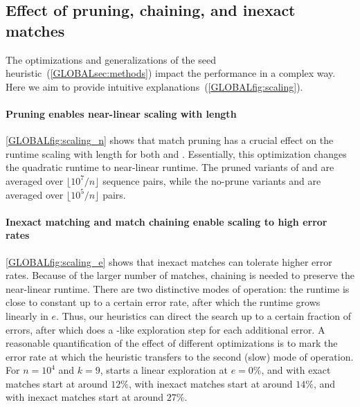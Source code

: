 \subsection{Effect of pruning, chaining, and inexact matches}\label{GLOBALsec:techniques}



The optimizations and generalizations of the seed heuristic~(\cref{GLOBALsec:methods})
impact the performance in a complex way. Here we aim to provide intuitive
explanations~(\cref{GLOBALfig:scaling}).

\paragraph{Pruning enables near-linear scaling with length}
\cref{GLOBALfig:scaling_n} shows that match pruning has a crucial effect on the
runtime scaling with length for both \SH and \CSH. Essentially, this
optimization changes the quadratic runtime to near-linear runtime. The pruned
variants of \SH and \CSH are averaged over $\lfloor 10^7 / n \rfloor$ sequence pairs,
while the no-prune variants and \dijkstra are averaged over $\lfloor 10^5 / n
\rfloor$ pairs.

\paragraph{Inexact matching and match chaining enable scaling to high error rates}
\cref{GLOBALfig:scaling_e} shows that inexact matches can tolerate higher error rates.
Because of the larger number of matches, chaining is needed to preserve the
near-linear runtime. There are two distinctive modes of operation: the runtime
is close to constant up to a certain error rate, after which the runtime grows
linearly in $e$. Thus, our heuristics can direct the search up to a certain
fraction of errors, after which does a \dijkstra-like exploration step for each
additional error. A reasonable quantification of the effect of different
optimizations is to mark the error rate at which the heuristic transfers to the
second (slow) mode of operation. For $n{=}10^4$ and $k{=}9$, \dijkstra starts a
linear exploration at $e{=}0\%$, \SH and \CSH with exact matches start at around
$12\%$, \SH with inexact matches start at around $14\%$, and \CSH with inexact
matches start at around $27\%$.



